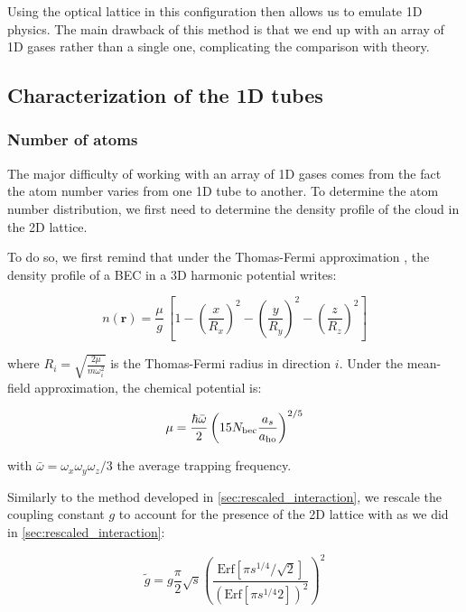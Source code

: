 Using the optical lattice in this configuration then allows us to emulate 1D physics. The main drawback of this method is that we end up with an array of 1D gases rather than a single one, complicating the comparison with theory.


\subsection{Characterization of the 1D tubes}

\subsubsection{Number of atoms}

The major difficulty of working with an array of 1D gases comes from the fact the atom number varies from one 1D tube to another. To determine the atom number distribution, we first need to determine the density profile of the cloud in the 2D lattice.

To do so, we first remind that under the Thomas-Fermi approximation \cite{pethick2008bose}, the density profile of a BEC in a 3D harmonic potential writes:

\begin{equation}
     n(\bm{r}) = \frac{\mu}{g} \, \left[ 1 - \left( \frac{x}{R_x} \right)^2 - \left( \frac{y}{R_y} \right)^2 - \left( \frac{z}{R_z} \right)^2 \right]
\end{equation}

\noindent where $R_i = \sqrt{\frac{2 \mu}{m \omega_i^2}}$ is the Thomas-Fermi radius in direction $i$. Under the mean-field approximation, the chemical potential is:

\begin{equation}
     \mu = \frac{\hbar \bar{\omega}}{2} \left(  15 N_{\rm{bec}} \frac{a_s}{a_{\rm{ho}}}\right)^{2/5}
\end{equation}

\noindent with $\bar{\omega}=\omega_x \omega_y \omega_z/3$ the average trapping frequency.

Similarly to the method developed in \ref{sec:rescaled_interaction}, we rescale the coupling constant $g$ to account for the presence of the 2D lattice with as we did in \ref{sec:rescaled_interaction}:

\begin{equation}
   \tilde{g} = g \frac{\pi}{2} \sqrt{s} \left( \frac{\textrm{Erf} [ \pi s^{1/4} / \sqrt{2}]}{(\textrm{Erf} [ \pi s^{1/4} 2])^2} \right)^2
\end{equation}

